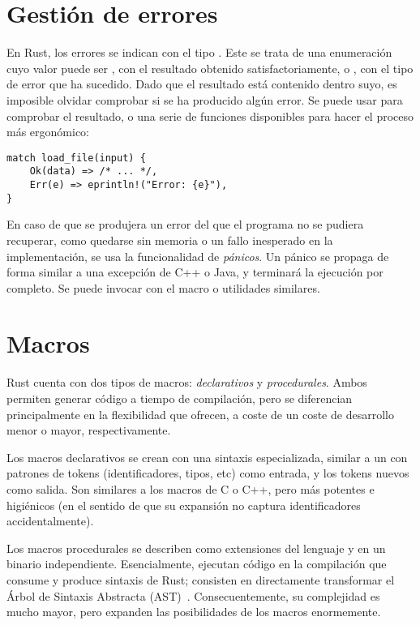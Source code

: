 \section{Gestión de errores}

En Rust, los errores se indican con el tipo . Este se trata
de una enumeración cuyo valor puede ser , con el resultado obtenido
satisfactoriamente, o , con el tipo de error que ha sucedido. Dado
que el resultado está contenido dentro suyo, es imposible olvidar comprobar si
se ha producido algún error. Se puede usar  para comprobar el
resultado, o una serie de funciones disponibles para hacer el proceso más
ergonómico:

\begin{verbatim}
match load_file(input) {
    Ok(data) => /* ... */,
    Err(e) => eprintln!("Error: {e}"),
}
\end{verbatim}

En caso de que se produjera un error del que el programa no se pudiera
recuperar, como quedarse sin memoria o un fallo inesperado en la implementación,
se usa la funcionalidad de \emph{pánicos}. Un pánico se propaga de forma similar
a una excepción de C++ o Java, y terminará la ejecución por completo. Se puede
invocar con el macro  o utilidades similares.

\section{Macros}

Rust cuenta con dos tipos de macros: \emph{declarativos} y \emph{procedurales}.
Ambos permiten generar código a tiempo de compilación, pero se diferencian
principalmente en la flexibilidad que ofrecen, a coste de un coste de desarrollo
menor o mayor, respectivamente.

Los macros declarativos se crean con una sintaxis especializada, similar a un
 con patrones de tokens (identificadores, tipos, etc) como entrada,
y los tokens nuevos como salida. Son similares a los macros de C o C++, pero más
potentes e higiénicos (en el sentido de que su expansión no captura
identificadores accidentalmente).

Los macros procedurales se describen como extensiones del lenguaje y en un
binario independiente. Esencialmente, ejecutan código en la compilación que
consume y produce sintaxis de Rust; consisten en directamente transformar el
Árbol de Sintaxis Abstracta (AST)~\cite[Procedural Macros]{rustref}.
Consecuentemente, su complejidad es mucho mayor, pero expanden las posibilidades
de los macros enormemente.


